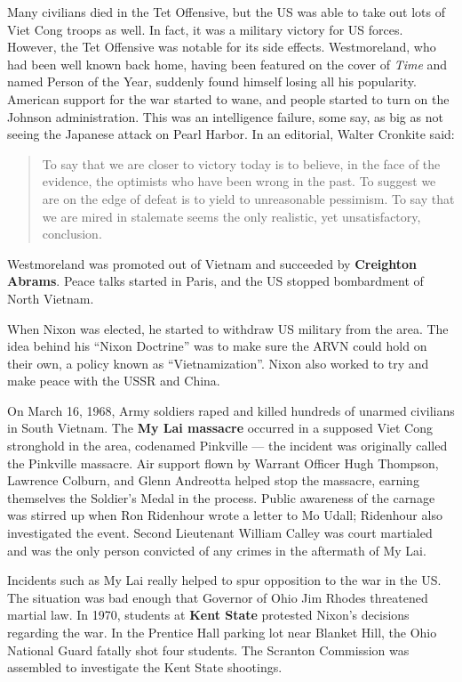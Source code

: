 Many civilians died in the Tet Offensive, but the US was able to take out lots of Viet Cong troops as well.
In fact, it was a military victory for US forces.
However, the Tet Offensive was notable for its side effects.
Westmoreland, who had been well known back home,
having been featured on the cover of \textit{Time} and named Person of the Year,
suddenly found himself losing all his popularity.
American support for the war started to wane, and people started to turn on the Johnson administration.
This was an intelligence failure, some say, as big as not seeing the Japanese attack on Pearl Harbor.
In an editorial, Walter Cronkite said:
\begin{quote}
  To say that we are closer to victory today is to believe, in the face of the evidence,
  the optimists who have been wrong in the past.
  To suggest we are on the edge of defeat is to yield to unreasonable pessimism.
  To say that we are mired in stalemate seems the only realistic, yet unsatisfactory, conclusion.
\end{quote}
Westmoreland was promoted out of Vietnam and succeeded by \textbf{Creighton Abrams}.
Peace talks started in Paris, and the US stopped bombardment of North Vietnam.

When Nixon was elected, he started to withdraw US military from the area.
The idea behind his ``Nixon Doctrine'' was to make sure the ARVN could hold on their own,
a policy known as ``Vietnamization''.
Nixon also worked to try and make peace with the USSR and China.

On March 16, 1968, Army soldiers raped and killed hundreds of unarmed civilians in South Vietnam.
The \textbf{My Lai massacre} occurred in a supposed Viet Cong stronghold in the area, codenamed Pinkville ---
the incident was originally called the Pinkville massacre.
Air support flown by Warrant Officer Hugh Thompson, Lawrence Colburn, and Glenn Andreotta helped stop the massacre,
earning themselves the Soldier's Medal in the process.
Public awareness of the carnage was stirred up when Ron Ridenhour wrote a letter to Mo Udall;
Ridenhour also investigated the event.
Second Lieutenant William Calley was court martialed
and was the only person convicted of any crimes in the aftermath of My Lai.

Incidents such as My Lai really helped to spur opposition to the war in the US\@.
The situation was bad enough that Governor of Ohio Jim Rhodes threatened martial law.
In 1970, students at \textbf{Kent State} protested Nixon's decisions regarding the war.
In the Prentice Hall parking lot near Blanket Hill, the Ohio National Guard fatally shot four students.
The Scranton Commission was assembled to investigate the Kent State shootings.


